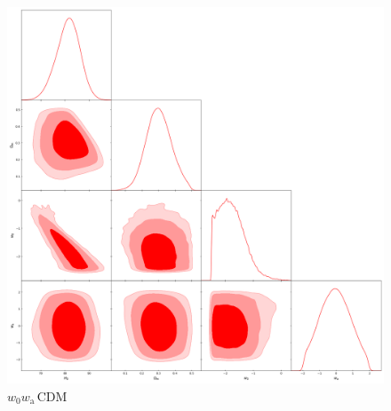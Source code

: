 \documentclass{cosmo}
\begin{document}
    \begin{figure}[h]
        \centering
        \includegraphics[width=1\textwidth]{H0LiCOW-w0waCDM-allN.png}
        \caption{$w_\mathrm{0}w_\mathrm{a}\,$CDM}
        \label{fig13}
    \end{figure}
    
\end{document}
